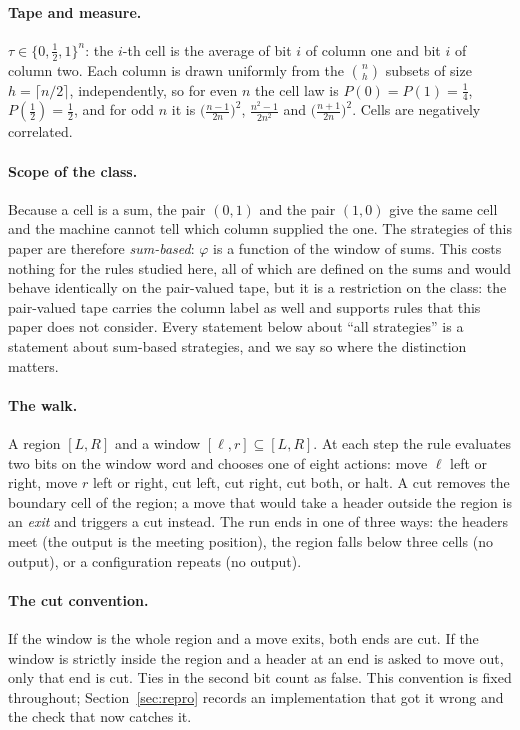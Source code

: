 \documentclass[11pt]{article}
\begin{document}
\paragraph{Tape and measure.} $\tau\in\{0,\tfrac12,1\}^n$: the $i$-th cell is the average of
bit $i$ of column one and bit $i$ of column two. Each column is drawn uniformly from the
$\binom nh$ subsets of size $h=\lceil n/2\rceil$, independently, so for even $n$ the cell
law is $P(0)=P(1)=\tfrac14$, $P(\tfrac12)=\tfrac12$, and for odd $n$ it is
$\big(\frac{n-1}{2n}\big)^2$, $\frac{n^2-1}{2n^2}$ and $\big(\frac{n+1}{2n}\big)^2$. Cells
are negatively correlated.

\paragraph{Scope of the class.} Because a cell is a sum, the pair $(0,1)$ and the pair
$(1,0)$ give the same cell and the machine cannot tell which column supplied the one. The
strategies of this paper are therefore \emph{sum-based}: $\varphi$ is a function of the window
of sums. This costs nothing for the rules studied here, all of which are defined on the sums
and would behave identically on the pair-valued tape, but it is a restriction on the class:
the pair-valued tape carries the column label as well and supports rules that this paper does
not consider. Every statement below about ``all strategies'' is a statement about sum-based
strategies, and we say so where the distinction matters.

\paragraph{The walk.} A region $[L,R]$ and a window $[\ell,r]\subseteq[L,R]$. At each step
the rule evaluates two bits on the window word and chooses one of eight actions: move
$\ell$ left or right, move $r$ left or right, cut left, cut right, cut both, or halt. A cut
removes the boundary cell of the region; a move that would take a header outside the
region is an \emph{exit} and triggers a cut instead. The run ends in one of three ways: the
headers meet (the output is the meeting position), the region falls below three cells (no
output), or a configuration repeats (no output).

\paragraph{The cut convention.} If the window is the whole region and a move exits, both
ends are cut. If the window is strictly inside the region and a header at an end is asked
to move out, only that end is cut. Ties in the second bit count as false. This convention
is fixed throughout; Section~\ref{sec:repro} records an implementation that got it wrong
and the check that now catches it.
\end{document}
